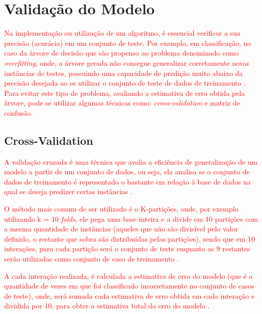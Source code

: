 \section{Validação do Modelo}

\par
\textcolor{red}{Na implementação ou utilização de um algoritmo, é essencial verificar a sua precisão (acurácia) em um conjunto de teste. Por exemplo, em classificação, no caso da árvore de decisão que são propenso ao problema denominado como \textit{overfitting}, onde, a árvore gerada não consegue generalizar corretamente novas instâncias de testes, possuindo uma capacidade de predição muito abaixo da precisão desejada ao se utilizar o conjunto de teste de dados de treinamento \cite{Carvalho2014}. Para evitar este tipo de problema, avaliando a estimativa de erro obtida pela árvore, pode se utilizar algumas técnicas como: \textit{cross-validation} e matriz de confusão.}



\subsection{Cross-Validation}

\par
\textcolor{red}{A validação cruzada é uma técnica que avalia a eficiência de generalização de um modelo a partir de um conjunto de dados, ou seja, ela analisa se o conjunto de dados de treinamento é representado o bastante em relação à base de dados na qual se deseja predizer certas instâncias \cite{Carvalho2014, Monard2003}.}

\par
\textcolor{red}{O método mais comum de ser utilizado é o K-partições, onde, por exemplo utilizando k = 10 \textit{folds}, ele pega uma base inteira e a divide em 10 partições com a mesma quantidade de instâncias (aqueles que não são divisível pelo valor definido, o restante que sobra são distribuídas pelas partições), sendo que em 10 interações, para cada partição será o conjunto de teste enquanto as 9 restantes serão utilizadas como conjunto de caso de treinamento \cite{Carvalho2014}.}

\par
\textcolor{red}{A cada interação realizada, é calculada a estimativa de erro do modelo (que é a quantidade de vezes em que foi classificado incorretamente no conjunto de casos de teste), onde, será somada cada estimativa de erro obtida em cada interação e dividida por 10, para obter a estimativa total do erro do modelo \cite{Carvalho2014}.}

